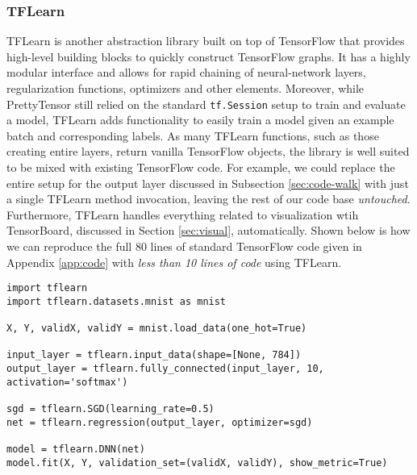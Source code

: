 \subsubsection{TFLearn}\label{sec:code-abstract-prettytensor}

TFLearn is another abstraction library built on top of TensorFlow that provides
high-level building blocks to quickly construct TensorFlow graphs. It has a
highly modular interface and allows for rapid chaining of neural-network layers,
regularization functions, optimizers and other elements. Moreover, while
PrettyTensor still relied on the standard \texttt{tf.Session} setup to train and
evaluate a model, TFLearn adds functionality to easily train a model given an
example batch and corresponding labels. As many TFLearn functions, such as those
creating entire layers, return vanilla TensorFlow objects, the library is well
suited to be mixed with existing TensorFlow code. For example, we could replace
the entire setup for the output layer discussed in Subsection
\ref{sec:code-walk} with just a single TFLearn method invocation, leaving the
rest of our code base \emph{untouched}. Furthermore, TFLearn handles everything
related to visualization wtih TensorBoard, discussed in Section
\ref{sec:visual}, automatically. Shown below is how we can reproduce the full 80
lines of standard TensorFlow code given in Appendix \ref{app:code} with
\emph{less than 10 lines of code} using TFLearn.

\begin{lstlisting}
import tflearn
import tflearn.datasets.mnist as mnist

X, Y, validX, validY = mnist.load_data(one_hot=True)

input_layer = tflearn.input_data(shape=[None, 784])
output_layer = tflearn.fully_connected(input_layer, 10, activation='softmax')

sgd = tflearn.SGD(learning_rate=0.5)
net = tflearn.regression(output_layer, optimizer=sgd)

model = tflearn.DNN(net)
model.fit(X, Y, validation_set=(validX, validY), show_metric=True)
\end{lstlisting}

